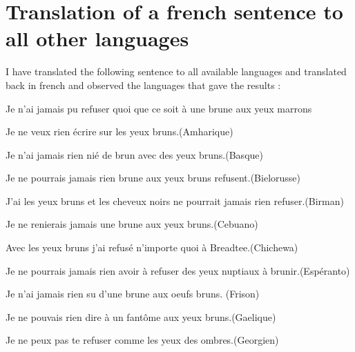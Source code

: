 \documentclass[a4paper, 11pt]{article}
\begin{document}
\appendix
\newpage
\section{Translation of a french sentence to all other languages}
\label{sec:all-translations}

I have translated the following sentence to all available languages
and translated back in french and observed the languages that gave the
 results :

\begin{inputcbox}
  Je n'ai jamais pu refuser quoi que ce soit à une brune aux yeux marrons
\end{inputcbox}

\begin{outputcbox}
Je ne veux rien écrire sur les yeux bruns.\hfill(Amharique)
\end{outputcbox}
\begin{outputcbox}
Je n'ai jamais rien nié de brun avec des yeux bruns.\hfill(Basque)
\end{outputcbox}
\begin{outputcbox}
Je ne pourrais jamais rien brune aux yeux bruns refusent.\hfill(Bielorusse)
\end{outputcbox}
\begin{outputcbox}
J'ai les yeux bruns et les cheveux noirs ne pourrait jamais rien refuser.\hfill(Birman)
\end{outputcbox}
\begin{outputcbox}
Je ne renierais jamais une brune aux yeux bruns.\hfill(Cebuano)
\end{outputcbox}
\begin{outputcbox}
Avec les yeux bruns j'ai refusé n'importe quoi à Breadtee.\hfill(Chichewa)
\end{outputcbox}
\begin{outputcbox}
Je ne pourrais jamais rien avoir à refuser des yeux nuptiaux à brunir.\hfill(Espéranto)
\end{outputcbox}
\begin{outputcbox}
Je n'ai jamais rien su d'une brune aux oeufs bruns. \hfill(Frison)
\end{outputcbox}
\begin{outputcbox}
Je ne pouvais rien dire à un fantôme aux yeux bruns.\hfill(Gaelique)
\end{outputcbox}
\begin{outputcbox}
Je ne peux pas te refuser comme les yeux des ombres.\hfill(Georgien)
\end{outputcbox}
\end{document}
